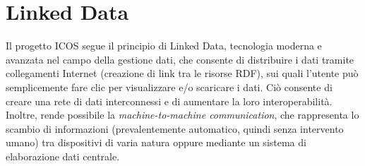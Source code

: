 \section{Linked Data}
\label{section:linkeddata}
Il progetto ICOS segue il principio di Linked Data, tecnologia moderna
e avanzata nel campo della gestione dati, che consente di distribuire
i dati tramite collegamenti Internet (creazione di link tra
le risorse RDF), sui quali l'utente
può semplicemente fare clic per visualizzare
e/o scaricare i dati. Ciò consente di creare
una rete di dati interconnessi
e di aumentare la loro interoperabilità. 
Inoltre, rende possibile la \textit{machine-to-machine
communication}, 
che rappresenta lo scambio di informazioni (prevalentemente
automatico,
quindi senza intervento umano) tra dispositivi di varia natura 
oppure mediante un sistema di elaborazione dati centrale.




